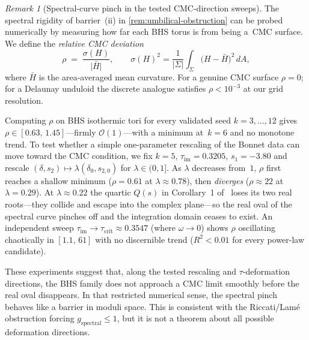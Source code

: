 \documentclass[11pt,a4paper]{article}
\theoremstyle{plain}
\theoremstyle{definition}
\theoremstyle{remark}
\newtheorem{remark}[theorem]{Remark}
\newcommand{\Oo}{\mathcal{O}}
\begin{document}
\begin{remark}[Spectral-curve pinch in the tested CMC-direction sweeps]
\label{rem:spectral-pinch}
The spectral rigidity of barrier~(ii) in
\cref{rem:umbilical-obstruction} can be probed numerically by
measuring how far each BHS torus is from being a~CMC surface.
We define the \emph{relative CMC deviation}
\[
  \rho \;=\; \frac{\sigma(H)}{\lvert\bar{H}\rvert},
  \qquad
  \sigma(H)^{2}
  = \frac{1}{\lvert\Sigma\rvert}
    \int_{\Sigma}\!\bigl(H - \bar{H}\bigr)^{2}\,dA,
\]
where $\bar{H}$ is the area-averaged mean curvature.
For a genuine CMC surface $\rho = 0$; for a Delaunay unduloid
the discrete analogue satisfies
$\rho < 10^{-3}$ at our grid resolution.

Computing $\rho$ on BHS isothermic tori for every validated seed
$k = 3, \dots, 12$ gives $\rho \in [0.63, \, 1.45]$---firmly
$\Oo(1)$---with a minimum at~$k = 6$ and no monotone trend.
To test whether a simple one-parameter rescaling of the Bonnet data can
move toward the CMC condition, we fix $k = 5$,
$\tau_{\mathrm{im}} = 0.3205$, $s_1 = -3.80$ and rescale
$(\delta, s_2) \mapsto \lambda(\delta_0, s_{2,0})$ for
$\lambda \in (0, 1]$.  As $\lambda$ decreases from~$1$,
$\rho$ first reaches a shallow minimum ($\rho = 0.61$ at
$\lambda \approx 0.78$), then \emph{diverges}
($\rho \approx 22$ at $\lambda = 0.29$).
At $\lambda \approx 0.22$ the quartic $Q(s)$ in
Corollary~1 of~\cite{BHS-comp} loses its two real roots---they
collide and escape into the complex plane---so the real oval
of the spectral curve pinches off and the integration domain
ceases to exist.
An independent sweep $\tau_{\mathrm{im}} \to \tau_{\mathrm{crit}}
\approx 0.3547$ (where $\omega \to 0$) shows $\rho$ oscillating
chaotically in $[1.1, \, 61]$ with no discernible trend
($R^{2} < 0.01$ for every power-law candidate).

These experiments suggest that, along the tested rescaling and
$\tau$-deformation directions, the BHS family does not approach a CMC
limit smoothly before the real oval disappears.  In that restricted
numerical sense, the spectral pinch behaves like a barrier in moduli
space.  This is consistent with the Riccati/Lam\'{e} obstruction forcing
$g_{\mathrm{spectral}} \le 1$, but it is not a theorem about all
possible deformation directions.
\end{remark}
\end{document}
